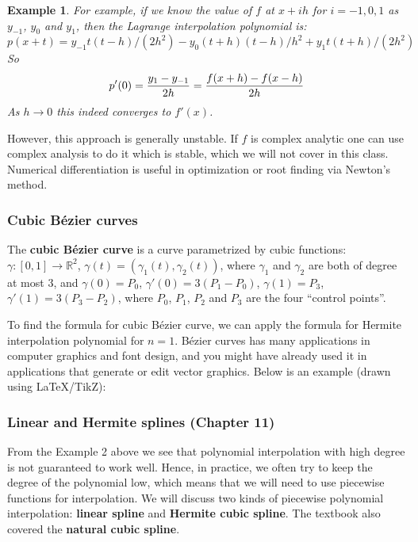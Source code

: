 \documentclass{article} %
\theoremstyle{break}
\newtheorem{exa}[definition]{Example}
\begin{document}
\begin{exa}
  For example, if we know the value of $f$ at $x+ih$ for $i=-1, 0, 1$ as $y_{-1}$, $y_0$ and $y_1$, then the Lagrange interpolation polynomial is:
  \[p(x+t)=y_{-1}t(t-h)/(2h^2)-y_0(t+h)(t-h)/h^2+y_1t(t+h)/(2h^2)\]
  So
  \[p'(0)={y_1-y_{-1}\over 2h}={f(x+h)-f(x-h)\over 2h}\]
  As $h\rightarrow 0$ this indeed converges to $f'(x)$.
 \end{exa}

However, this approach is generally unstable. If $f$ is complex analytic one can use complex analysis to do it which is stable, which we will not cover in this class.\\

Numerical differentiation is useful in optimization or root finding via Newton's method.


\subsubsection{Cubic B{\'e}zier curves}
The {\bf cubic B{\'e}zier curve} is a curve parametrized by cubic functions: $\gamma: [0, 1]\rightarrow \mathbb{R}^2$, $\gamma(t)=(\gamma_1(t), \gamma_2(t))$, where $\gamma_1$ and $\gamma_2$ are both of degree at most $3$, and $\gamma(0)=P_0$, $\gamma'(0)=3(P_1-P_0)$, $\gamma(1)=P_3$, $\gamma'(1)=3(P_3-P_2)$, where $P_0$, $P_1$, $P_2$ and $P_3$ are the four ``control points''.

To find the formula for cubic B{\'e}zier curve, we can apply the formula for Hermite interpolation polynomial for $n=1$. B{\'e}zier curves has many applications in computer graphics and font design, and you might have already used it in applications that generate or edit vector graphics. Below is an example (drawn using LaTeX/TikZ):
\begin{figure}[H]
\end{figure}

\subsubsection{Linear and Hermite splines (Chapter 11)}

From the Example 2 above we see that polynomial interpolation with high degree is not guaranteed to work well. Hence, in practice, we often try to keep the degree of the polynomial low, which means that we will need to use piecewise functions for interpolation. We will discuss two kinds of piecewise polynomial interpolation: {\bf linear spline} and {\bf Hermite cubic spline}. The textbook also covered the {\bf natural cubic spline}.
\end{document}
